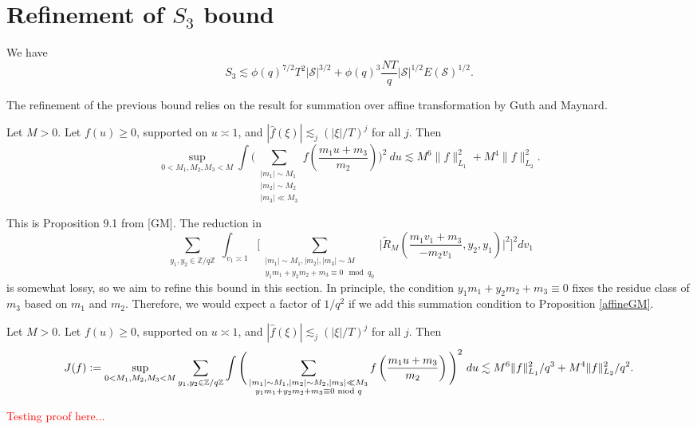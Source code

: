 \section{Refinement of $S_3$ bound}

\begin{proposition}[Refinement of $S_3$]
    \label{refinements_3}
    We have \[
    S_3\lesssim \phi(q)^{7/2}T^2|\mathcal{S}|^{3/2}+\phi(q)^{3}\frac{NT}{q}|\mathcal{S}|^{1/2}E(\mathcal{S})^{1/2}.
     \]
\end{proposition}
The refinement of the previous bound relies on the result for summation over affine transformation by Guth and Maynard.
\begin{lemma} \label{affineGM}
    Let $M>0$. Let $f(u)\geq 0$, supported on $u\asymp 1$, and $|\hat{f}(\xi)|\lesssim_j (|\xi|/T)^j$ for all $j$. Then \[
        \sup_{0<M_1,M_2,M_3<M} \int\Bigg( \sum_{\substack{|m_1|\sim M_1\\|m_2|\sim M_2 \\ |m_3|\ll M_3}} f\left(\frac{m_1 u+m_3}{m_2}\right)\Bigg)^2 \ du \lesssim M^6 \|f\|_{L_1}^2+M^4\|f\|_{L_2}^2.
    \] 
\end{lemma}
This is Proposition 9.1 from [GM]. The reduction in \[
\sum_{\substack{y_1,y_2 \in\mathbb{Z}/q\mathbb{Z} }}\int_{v_1\asymp 1}\Big[\sum_{\substack{|m_1|\sim M_1,|m_2|,|m_3|\sim M\\ y_1m_1+y_2m_2+m_3\equiv 0 \mod q_0}}\Big|\tilde{R}_M\left(\frac{m_1v_1+m_3}{-m_2v_1},y_2,y_1\right)\Big|^2\Big]^2dv_1\]
is somewhat lossy, so we aim to refine this bound in this section.
In principle, the condition $y_1m_1+y_2m_2+m_3\equiv 0$ fixes the residue class of $m_3$ based on $m_1$ and $m_2$. Therefore, we would expect a factor of $1/q^2$ if we add this summation condition to Proposition \ref{affineGM}. 
\begin{lemma}\label{affinetrans}
    Let $M>0$. Let $f(u)\geq 0$, supported on $u\asymp 1$, and $|\hat{f}(\xi)|\lesssim_j (|\xi|/T)^j$ for all $j$. Then \[
        J(f)\mathrel{\mathop:}= \sup_{0<M_1,M_2,M_3<M}\sum_{\substack{y_1,y_2 \in\mathbb{Z}/q\mathbb{Z} }} \int\Bigg( \sum_{\substack{|m_1|\sim M_1,|m_2|\sim M_2 , |m_3|\ll M_3\\ y_1m_1+y_2m_2+m_3\equiv 0 \textrm{ mod } q}} f\left(\frac{m_1 u+m_3}{m_2}\right)\Bigg)^2 \ du \lesssim M^6 \|f\|_{L_1}^2/q^3+M^4\|f\|_{L_2}^2/q^2.
    \] 
\end{lemma}
\textcolor{red}{Testing proof here...}

